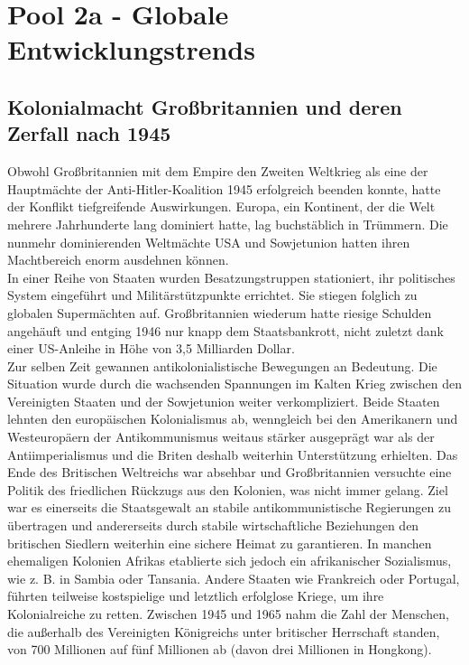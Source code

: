 \documentclass[letterpaper, 12pt]{article}
\let\tempsection\section
\renewcommand\section[1]{\vspace{-0.3cm}\tempsection{#1}\vspace{-0.3cm}}
\let\tempsubsection\subsection
\renewcommand\subsection[1]{\vspace{0cm}\tempsubsection{#1}\vspace{0cm}}
\begin{document}
\parindent 0pt
\parskip 6pt



\clearpage
\thispagestyle{empty}
\tableofcontents

\newpage
{}
\pagestyle{fancy}


\section{Pool 2a - Globale Entwicklungstrends \cite{buch}}

\subsection{Kolonialmacht Großbritannien und deren Zerfall nach 1945}

Obwohl Großbritannien mit dem Empire den Zweiten Weltkrieg als eine der Hauptmächte der Anti-Hitler-Koalition 1945 erfolgreich beenden konnte, hatte der Konflikt tiefgreifende Auswirkungen. Europa, ein Kontinent, der die Welt mehrere Jahrhunderte lang dominiert hatte, lag buchstäblich in Trümmern. Die nunmehr dominierenden Weltmächte USA und Sowjetunion hatten ihren Machtbereich enorm ausdehnen können. \\ In einer Reihe von Staaten wurden Besatzungstruppen stationiert, ihr politisches System eingeführt und Militärstützpunkte errichtet. Sie stiegen folglich zu globalen Supermächten auf. Großbritannien wiederum hatte riesige Schulden angehäuft und entging 1946 nur knapp dem Staatsbankrott, nicht zuletzt dank einer US-Anleihe in Höhe von 3,5 Milliarden Dollar. \\
Zur selben Zeit gewannen antikolonialistische Bewegungen an Bedeutung. Die Situation wurde durch die wachsenden Spannungen im Kalten Krieg zwischen den Vereinigten Staaten und der Sowjetunion weiter verkompliziert. Beide Staaten lehnten den europäischen Kolonialismus ab, wenngleich bei den Amerikanern und Westeuropäern der Antikommunismus weitaus stärker ausgeprägt war als der Antiimperialismus und die Briten deshalb weiterhin Unterstützung erhielten. Das Ende des Britischen Weltreichs war absehbar und Großbritannien versuchte eine Politik des friedlichen Rückzugs aus den Kolonien, was nicht immer gelang. Ziel war es einerseits die Staatsgewalt an stabile antikommunistische Regierungen zu übertragen und andererseits durch stabile wirtschaftliche Beziehungen den britischen Siedlern weiterhin eine sichere Heimat zu garantieren. In manchen ehemaligen Kolonien Afrikas etablierte sich jedoch ein afrikanischer Sozialismus, wie z. B. in Sambia oder Tansania. Andere Staaten wie Frankreich oder Portugal, führten teilweise kostspielige und letztlich erfolglose Kriege, um ihre Kolonialreiche zu retten. Zwischen 1945 und 1965 nahm die Zahl der Menschen, die außerhalb des Vereinigten Königreichs unter britischer Herrschaft standen, von 700 Millionen auf fünf Millionen ab (davon drei Millionen in Hongkong).
\end{document}
